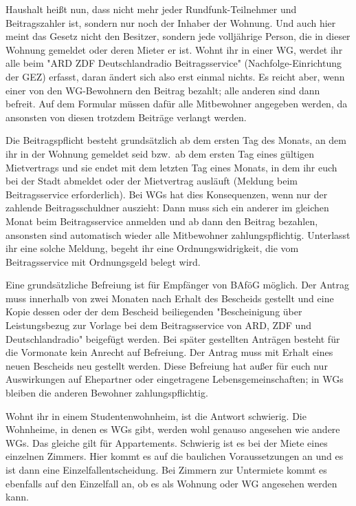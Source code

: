 \begin{multicols*}{2}
Haushalt heißt nun, dass nicht mehr jeder Rundfunk-Teilnehmer und Beitragszahler ist, sondern nur noch der Inhaber der Wohnung.
Und auch hier meint das Gesetz nicht den Besitzer, sondern jede volljährige Person, die in dieser Wohnung gemeldet oder deren Mieter er ist.
Wohnt ihr in einer WG, werdet ihr alle beim "ARD ZDF Deutschlandradio Beitragsservice" (Nachfolge-Einrichtung der GEZ) erfasst, daran ändert sich also erst einmal nichts.
Es reicht aber, wenn einer von den WG-Bewohnern den Beitrag bezahlt; alle anderen sind dann befreit.
Auf dem Formular müssen dafür alle Mitbewohner angegeben werden, da ansonsten von diesen trotzdem Beiträge verlangt werden.

Die Beitragspflicht besteht grundsätzlich ab dem ersten Tag des Monats, an dem ihr in der Wohnung gemeldet seid bzw.\ ab dem ersten Tag eines gültigen Mietvertrags und sie endet mit dem letzten Tag eines Monats, in dem ihr euch bei der Stadt abmeldet oder der Mietvertrag ausläuft (Meldung beim Beitragsservice erforderlich).
Bei WGs hat dies Konsequenzen, wenn nur der zahlende Beitragsschuldner auszieht: Dann muss sich ein anderer im gleichen Monat beim Beitragsservice anmelden und ab dann den Beitrag bezahlen, ansonsten sind automatisch wieder alle Mitbewohner zahlungspflichtig.
Unterlasst ihr eine solche Meldung, begeht ihr eine Ordnungswidrigkeit, die vom Beitragsservice mit Ordnungsgeld belegt wird.

Eine grundsätzliche Befreiung ist für Empfänger von BAföG möglich.
Der Antrag muss innerhalb von zwei Monaten nach Erhalt des Bescheids gestellt und eine Kopie dessen oder der dem Bescheid beiliegenden "Bescheinigung über Leistungsbezug zur Vorlage bei dem Beitragsservice von ARD, ZDF und Deutschlandradio" beigefügt werden.
Bei später gestellten Anträgen besteht für die Vormonate kein Anrecht auf Befreiung.
Der Antrag muss mit Erhalt eines neuen Bescheids neu gestellt werden.
Diese Befreiung hat außer für euch nur Auswirkungen auf Ehepartner oder eingetragene Lebensgemeinschaften; in WGs bleiben die anderen Bewohner zahlungspflichtig.

Wohnt ihr in einem Studentenwohnheim, ist die Antwort schwierig.
Die Wohnheime, in denen es WGs gibt, werden wohl genauso angesehen wie andere WGs.
Das gleiche gilt für Appartements.
Schwierig ist es bei der Miete eines einzelnen Zimmers.
Hier kommt es auf die baulichen Voraussetzungen an und es ist dann eine Einzelfallentscheidung.
Bei Zimmern zur Untermiete kommt es ebenfalls auf den Einzelfall an, ob es als Wohnung oder WG angesehen werden kann.


\end{multicols*}

